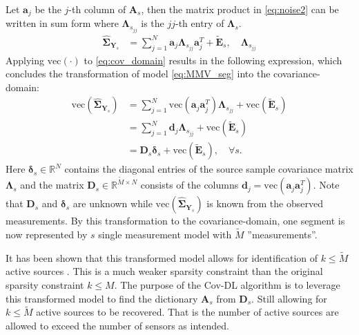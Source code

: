 Let $\mathbf{a}_j$ be the $j$-th column of $\mathbf{A}_s$, then the matrix product in \eqref{eq:noise2} can be written in sum form where $\boldsymbol{\Lambda}_{s_{jj}}$ is the $jj$-th entry of $\boldsymbol{\Lambda}_s$. 
\begin{align}
\widehat{\boldsymbol{\Sigma}}_{\mathbf{Y}_s} &= \sum_{j=1}^{N} \mathbf{a}_j \boldsymbol{\Lambda}_{s_{jj}} \mathbf{a}_j^{T} + \widetilde{\mathbf{E}}_s, \quad \boldsymbol{\Lambda}_{s_{jj}} \label{eq:cov_domain}
\end{align}
Applying $\text{vec}(\cdot)$ to \eqref{eq:cov_domain} results in the following expression, which concludes the transformation of model \eqref{eq:MMV_seg} into the covariance-domain: 
\begin{align}
\text{vec} \left(\widehat{\boldsymbol{\Sigma}}_{\mathbf{Y}_s} \right) &= \sum_{j=1}^N \text{vec}\left(\mathbf{a}_j \mathbf{a}_j^T\right) \boldsymbol{\Lambda}_{s_{jj}} + \text{vec}\left(\widetilde{\mathbf{E}}_s\right) \nonumber \\
&= \sum_{j=1}^N \mathbf{d}_j \boldsymbol{\Lambda}_{s_{jj}} + \text{vec}\left(\widetilde{\mathbf{E}}_s\right) \nonumber \\
&= \mathbf{D}_s \boldsymbol{\delta}_s + \text{vec}\left(\widetilde{\mathbf{E}}_s\right), \quad \forall s. \label{eq:cov1}
\end{align}
Here $\boldsymbol{\delta}_s \in \mathbb{R}^{N}$ contains the diagonal entries of the source sample covariance matrix $\boldsymbol{\Lambda}_s$ and the matrix $\mathbf{D}_s \in \mathbb{R}^{\widetilde{M} \times N}$ consists of the columns $\mathbf{d}_j = \text{vec}\left(\mathbf{a}_j \mathbf{a}_j^T\right)$. 
Note that $\mathbf{D}_s$ and $\boldsymbol{\delta}_s$ are unknown while $\text{vec}\left( \widehat{\boldsymbol{\Sigma}}_{\mathbf{Y}_s}\right)$ is known from the observed measurements.
By this transformation to the covariance-domain, one segment is now represented by $s$ single measurement model with $\widetilde{M}$ ''measurements''. 

It has been shown that this transformed model allows for identification of $k \leq \widetilde{M}$ active sources \cite{Pal2015}. This is a much weaker sparsity constraint than the original sparsity constraint $k \leq M$. 
The purpose of the Cov-DL algorithm is to leverage this transformed model to find the dictionary $\mathbf{A}_s$ from $\mathbf{D}_s$. Still allowing for $k \leq \widetilde{M}$ active sources to be recovered. 
That is the number of active sources are allowed to exceed the number of sensors as intended.


